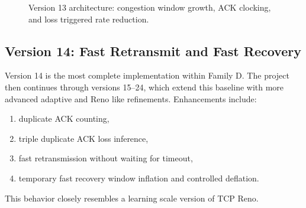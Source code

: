 \begin{figure}[h!]
{%
}
\caption{Version 13 architecture: congestion window growth, ACK clocking, and loss triggered rate reduction.
}
\label{fig:v13-architecture}
\end{figure}

\clearpage
\subsection{Version 14: Fast Retransmit and Fast Recovery}
Version 14 is the most complete implementation within Family D.
The project then continues through versions 15--24, which extend this baseline
with more advanced adaptive and Reno like refinements.
Enhancements include:

\begin{enumerate}
    \item duplicate ACK counting,
    \item triple duplicate ACK loss inference,
    \item fast retransmission without waiting for timeout,
    \item temporary fast recovery window inflation and controlled deflation.
\end{enumerate}

This behavior closely resembles a learning scale version of TCP Reno.

